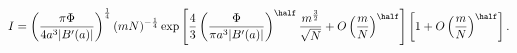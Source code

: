 \begin{equation}
\label{Eq_A10}
I = \left(\frac{\pi \Phi}{4 a^3 |B'(a)|}\right)^{\frac{1}{4}}
    (mN)^{-\frac{1}{4}}
  \exp
  \left[
  \frac{4}{3} \left(\frac{\Phi}{\pi a^3|B'(a)|}\right)^{\half}
  \frac{m^{\frac{3}{2}}}{\sqrt{N}} + O\left(\frac{m}{N}\right)^{\half}
  \right]
  \left[1 + O\left(\frac{m}{N}\right)^{\half}\right]. 
\end{equation}

